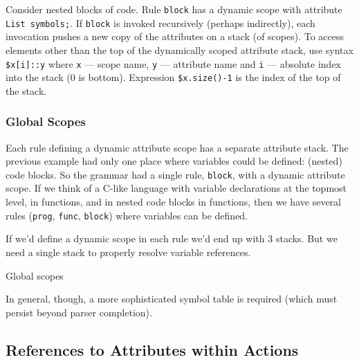 Consider nested blocks of code.
Rule \verb=block= has a dynamic scope with attribute \verb=List symbols;=.
If \verb=block= is invoked recursively (perhaps indirectly),
each invocation pushes a new copy of the attributes on a stack (of scopes).
To access elements other than the top
of the dynamically scoped attribute stack, use syntax \verb=$x[i]::y=
where \verb=x= --- scope name, \verb=y= --- attribute name and
\verb=i= --- absolute index into the stack (0 is bottom).
Expression \verb=$x.size()-1= is the index of the top of the stack.

\subsubsection{Global Scopes}

Each rule defining a dynamic attribute scope has a separate attribute stack.
The previous example had only one place where variables could be defined:
(nested) code blocks.
So the grammar had a single rule, \verb=block=, with a dynamic attribute scope.
If we think of a C-like language with variable declarations
at the topmost level, in functions, and in nested code blocks in functions,
then we have several rules (\verb=prog=, \verb=func=, \verb=block=)
where variables can be defined.

If we'd define a dynamic scope in each rule we'd end up with 3 stacks.
But we need a single stack to properly resolve variable references.

\begin{program}
\caption{Global scopes\label{aa:global-scopes}}
\end{program}

In general, though, a more sophisticated symbol table is required
(which must persist beyond parser completion).


\subsection{References to Attributes within Actions}

